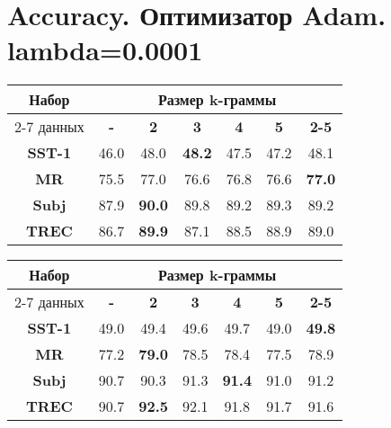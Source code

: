 
\chapter{Accuracy. Оптимизатор Adam. lambda=0.0001}

\begin{minipage}{\linewidth}
\begin{center}
 \label{tab:title} 
\begin{tabular}{|c|c|c|c|c|c|c|}
\hline
\multirow{2}{*}{Набор}   &         \multicolumn{6}{c|}{Размер k-граммы} \\ \cline{2-7} 
     данных              & \textbf{-} & \textbf{2} & \textbf{3} & \textbf{4} & \textbf{5} & \textbf{2-5} \\ \hline
\textbf{SST-1}           &  46.0    & 48.0     &\textbf{48.2}&47.5 &  47.2    & 48.1           \\  \hline
\textbf{MR}              &  75.5    & 77.0     & 76.6              & 76.8   & 76.6     & \textbf{77.0} \\ \hline
\textbf{Subj}            &  87.9    & \textbf{90.0}     & 89.8    & 89.2   & 89.3 & 89.2 \\ \hline
\textbf{TREC}            &  86.7    & \textbf{89.9} & 87.1& 88.5   &  88.9  & 89.0  \\ \hline
\end{tabular}
\vspace{5mm}
\end{center}
\end{minipage}

\vspace{5mm}
\begin{minipage}{\linewidth}
\begin{center}
 \label{tab:title} 
\begin{tabular}{|c|c|c|c|c|c|c|}
\hline
\multirow{2}{*}{Набор}   &                \multicolumn{6}{c|}{Размер k-граммы} \\ \cline{2-7} 
     данных              & \textbf{-} & \textbf{2} & \textbf{3} & \textbf{4} & \textbf{5} & \textbf{2-5} \\ \hline
\textbf{SST-1}           & 49.0       &  49.4    & 49.6    & 49.7     & 49.0     & \textbf{49.8}  \\ \hline
\textbf{MR}              & 77.2       &  \textbf{79.0}     & 78.5     & 78.4     & 77.5     & 78.9 \\\hline
\textbf{Subj}            & 90.7       &  90.3    & 91.3    &\textbf{91.4}& 91.0  &  91.2 \\\hline
\textbf{TREC}            & 90.7       &  \textbf{92.5}     & 92.1     & 91.8     & 91.7     &  91.6 \\\hline
\end{tabular}
\end{center}
\end{minipage}

